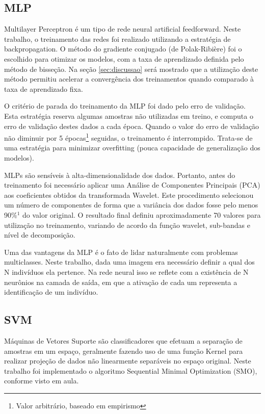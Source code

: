 \documentclass[conference]{IEEEtran}
\begin{document}
\subsection{MLP}
Multilayer Perceptron é um tipo de rede neural artificial feedforward. Neste trabalho, o treinamento das redes foi realizado utilizando a estratégia de backpropagation. O método do gradiente conjugado (de Polak-Ribière) foi o escolhido para otimizar os modelos, com a taxa de aprendizado definida pelo método de bisseção. Na seção \ref{sec:discussao} será mostrado que a utilização deste método permitiu acelerar a convergência dos treinamentos quando comparado à taxa de aprendizado fixa.

O critério de parada do treinamento da MLP foi dado pelo erro de validação. Esta estratégia reserva algumas amostras não utilizadas em treino, e computa o erro de validação destes dados a cada época. Quando o valor do erro de validação não diminuir por 5 épocas\footnote{Valor arbitrário, baseado em empirismo} seguidas, o treinamento é interrompido. Trata-se de uma estratégia para minimizar overfitting (pouca capacidade de generalização dos modelos).

MLPs são sensíveis à alta-dimensionalidade dos dados. Portanto, antes do treinamento foi necessário aplicar uma Análise de Componentes Principais (PCA) aos coeficientes obtidos da transformada Wavelet. Este procedimento selecionou um número de componentes de forma que a variância dos dados fosse pelo menos 90\%$^1$ do valor original. O resultado final definiu aproximadamente 70 valores para utilização no treinamento, variando de acordo da função wavelet, sub-bandas e nível de decomposição.

Uma das vantagens da MLP é o fato de lidar naturalmente com problemas multiclasses. Neste trabalho, dada uma imagem era necessário definir a qual dos N indivíduos ela pertence. Na rede neural isso se reflete com a existência de N neurônios na camada de saída, em que a ativação de cada um representa a identificação de um indivíduo.


\subsection{SVM}
Máquinas de Vetores Suporte são classificadores que efetuam a separação de amostras em um espaço, geralmente fazendo uso de uma função Kernel para realizar projeção de dados não linearmente separáveis no espaço original. Neste trabalho foi implementado o algoritmo Sequential Minimal Optimization (SMO), conforme visto em aula. 
\end{document}
